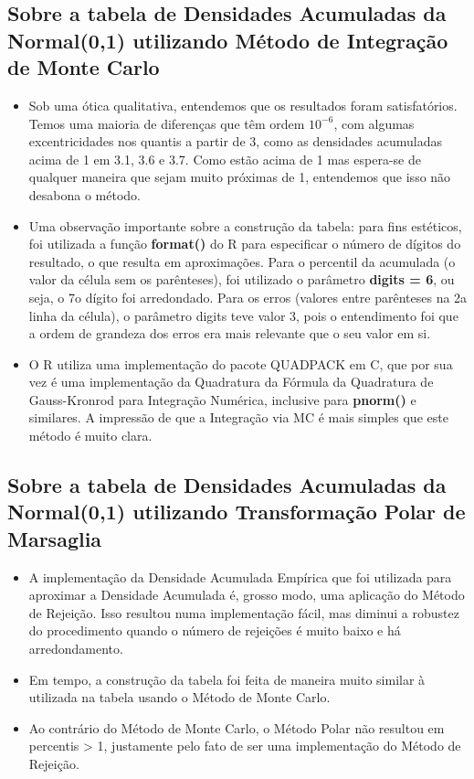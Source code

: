 \documentclass[
	article,			%
	12pt,				%
	twoside,			%
	a4paper,			%
	english,			%
	brazil,				%
	]{abntex2}
\begin{document}
\subsection{Sobre a tabela de Densidades Acumuladas da Normal(0,1) utilizando Método de Integração de Monte Carlo}

\begin{itemize}
  \item Sob uma ótica qualitativa, entendemos que os resultados foram satisfatórios. Temos uma maioria de diferenças que têm ordem $10^{-6}$, com algumas excentricidades nos quantis a partir de 3, como as densidades acumuladas acima de 1 em 3.1, 3.6 e 3.7. Como estão acima de 1 mas espera-se de qualquer maneira que sejam muito próximas de 1, entendemos que isso não desabona o método.
  \item Uma observação importante sobre a construção da tabela: para fins estéticos, foi utilizada a função \textbf{format()} do R para especificar o número de dígitos do resultado, o que resulta em aproximações. Para o percentil da acumulada (o valor da célula sem os parênteses), foi utilizado o parâmetro \textbf{digits = 6}, ou seja, o 7o dígito foi arredondado. Para os erros (valores entre parênteses na 2a linha da célula), o parâmetro digits teve valor 3, pois o entendimento foi que a ordem de grandeza dos erros era mais relevante que o seu valor em si.
  \item O R utiliza uma implementação do pacote QUADPACK\cite{wiki:003} em C, que por sua vez é uma implementação da Quadratura da Fórmula da Quadratura de Gauss-Kronrod para Integração Numérica, inclusive para \textbf{pnorm()} e similares. A impressão de que a Integração via MC é mais simples que este método é muito clara.
\end{itemize}

\subsection{Sobre a tabela de Densidades Acumuladas da Normal(0,1) utilizando Transformação Polar de Marsaglia}
\begin{itemize}
  \item A implementação da Densidade Acumulada Empírica que foi utilizada para aproximar a Densidade Acumulada é, grosso modo, uma aplicação do Método de Rejeição. Isso resultou numa implementação fácil, mas diminui a robustez do procedimento quando o número de rejeições é muito baixo e há arredondamento.
  \item Em tempo, a construção da tabela foi feita de maneira muito similar à utilizada na tabela usando o Método de Monte Carlo.
  \item Ao contrário do Método de Monte Carlo, o Método Polar não resultou em percentis > 1, justamente pelo fato de ser uma implementação do Método de Rejeição.
\end{itemize}
\end{document}
